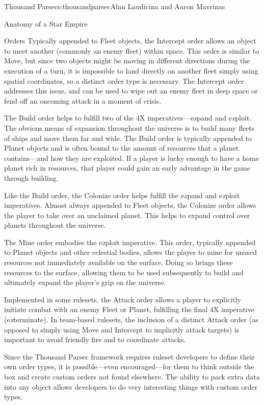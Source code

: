 \begin{aosachapter}{Thousand Parsec}{s:thousandparsec}{Alan Laudicina and Aaron Mavrinac}
\begin{aosasect1}{Anatomy of a Star Empire}
\begin{aosasect2}{Orders}
Typically appended to Fleet objects, the Intercept order allows an
object to meet another (commonly an enemy fleet) within space. This
order is similar to Move, but since two objects might be moving in
different directions during the execution of a turn, it is impossible
to land directly on another fleet simply using spatial coordinates, so
a distinct order type is necessary. The Intercept order addresses this
issue, and can be used to wipe out an enemy fleet in deep space or
fend off an oncoming attack in a moment of crisis.

The Build order helps to fulfill two of the 4X
imperatives---e\emph{x}pand and e\emph{x}ploit. The obvious means of
expansion throughout the universe is to build many fleets of ships and
move them far and wide. The Build order is typically appended to
Planet objects and is often bound to the amount of resources that a
planet contains---and how they are exploited. If a player is lucky
enough to have a home planet rich in resources, that player could gain
an early advantage in the game through building.

Like the Build order, the Colonize order helps fulfill the
e\emph{x}pand and e\emph{x}ploit imperatives. Almost always appended
to Fleet objects, the Colonize order allows the player to take over an
unclaimed planet. This helps to expand control over planets throughout
the universe.

The Mine order embodies the e\emph{x}ploit imperative. This order,
typically appended to Planet objects and other celestial bodies,
allows the player to mine for unused resources not immediately
available on the surface. Doing so brings these resources to the
surface, allowing them to be used subsequently to build and ultimately
expand the player's grip on the universe.

Implemented in some rulesets, the Attack order allows a player to
explicitly initiate combat with an enemy Fleet or Planet, fulfilling
the final 4X imperative (e\emph{x}terminate). In team-based rulesets,
the inclusion of a distinct Attack order (as opposed to simply using
Move and Intercept to implicitly attack targets) is important to avoid
friendly fire and to coordinate attacks.

Since the Thousand Parsec framework requires ruleset developers to
define their own order types, it is possible---even encouraged---for
them to think outside the box and create custom orders not found
elsewhere. The ability to pack extra data into any object allows
developers to do very interesting things with custom order types.


\end{aosasect2}
\end{aosasect1}
\end{aosachapter}
